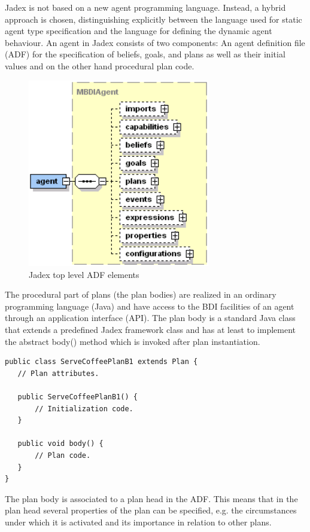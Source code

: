 Jadex is not based on a new agent programming language.
Instead, a hybrid approach is chosen, distinguishing explicitly between the language used for static agent type specification and the language for defining the dynamic agent behaviour.
An agent in Jadex consists of two components: An agent definition file (ADF) for the specification of beliefs, goals, and plans as well as their initial values and on the other hand procedural plan code.
\begin{figure}
	\centering
	\includegraphics[width=300px]{images/jadexagentadf.png}
  \caption{Jadex top level ADF elements \cite{ActiveComponents}}
	\label{fig3}
\end{figure}
The procedural part of plans  (the plan bodies) are realized in an ordinary programming language (Java) and have access to the BDI facilities of an agent through an application interface (API).
The plan body is a standard Java class that extends a predefined Jadex framework class and has at least to implement the abstract body() method which is invoked after plan instantiation.
\begin{lstlisting}
public class ServeCoffeePlanB1 extends Plan {
   // Plan attributes.

   public ServeCoffeePlanB1() {
       // Initialization code.
   }

   public void body() {
       // Plan code.
   }
}
\end{lstlisting}
The plan body is associated to a plan head in the ADF.
This means that in the plan head several properties of the plan can be specified, e.g. the circumstances under which it is activated and its importance in relation to other plans.
